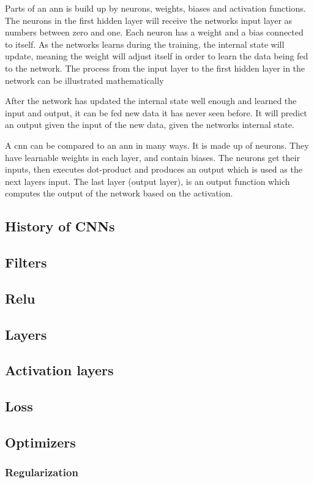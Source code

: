 \documentclass[USenglish]{ifimaster}  %
\begin{document}
Parts of an \ac{ann} is build up by neurons, weights, biases and activation functions. The neurons in the first hidden layer will receive the networks input layer as numbers between zero and one. Each neuron has a weight and a bias connected to itself. As the networks learns during the training, the internal state will update, meaning the weight will adjust itself in order to learn the data being fed to the network. The process from the input layer to the first hidden layer in the network can be illustrated mathematically

After the network has updated the internal state well enough and learned the input and output, it can be fed new data it has never seen before. It will predict an output given the input of the new data, given the networks internal state.  

A \ac{cnn} can be compared to an \ac{ann} in many ways. It is made up of neurons. They have learnable weights in each layer, and contain biases. The neurons get their inputs, then executes dot-product and produces an output which is used as the next layers input. The last layer (output layer), is an output function which computes the output of the network based on the activation.     
\subsection{History of CNNs}
\subsection{Filters}
\subsection{Relu}
\subsection{Layers}
\subsection{Activation layers}
\subsection{Loss}
\subsection{Optimizers}
\subsubsection{Regularization}
\end{document}
